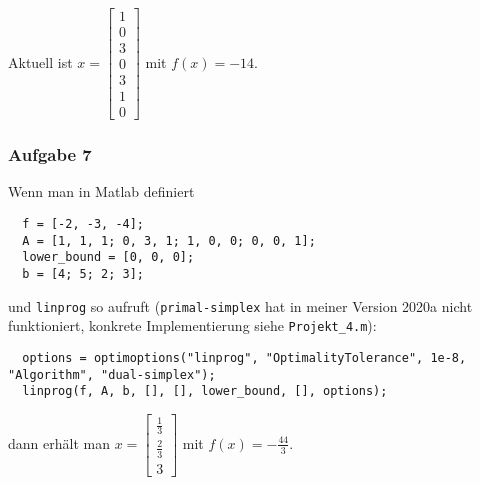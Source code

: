 \documentclass[a4paper, 12pt]{report}
\begin{document}
Aktuell ist $x = \begin{bmatrix} 1\\0\\3\\0\\3\\1\\0 \end{bmatrix}$ mit $f(x) = -14$.

\subsubsection{Aufgabe 7}
Wenn man in Matlab definiert

\begin{lstlisting}
  f = [-2, -3, -4];
  A = [1, 1, 1; 0, 3, 1; 1, 0, 0; 0, 0, 1];
  lower_bound = [0, 0, 0];
  b = [4; 5; 2; 3];\end{lstlisting}

und \lstinline[basicstyle=\ttfamily\color{black}]|linprog| so aufruft
(\lstinline[basicstyle=\ttfamily\color{black}]|primal-simplex| hat in meiner Version 2020a nicht funktioniert,
konkrete Implementierung siehe \lstinline[basicstyle=\ttfamily\color{black}]|Projekt_4.m|):

\begin{lstlisting}
  options = optimoptions("linprog", "OptimalityTolerance", 1e-8, "Algorithm", "dual-simplex");
  linprog(f, A, b, [], [], lower_bound, [], options);\end{lstlisting}

dann erhält man $x = \begin{bmatrix}\frac{1}{3}\\[6pt]\frac{2}{3}\\[6pt]3\end{bmatrix}$ mit $f(x) = -\frac{44}{3}$.
\end{document}
